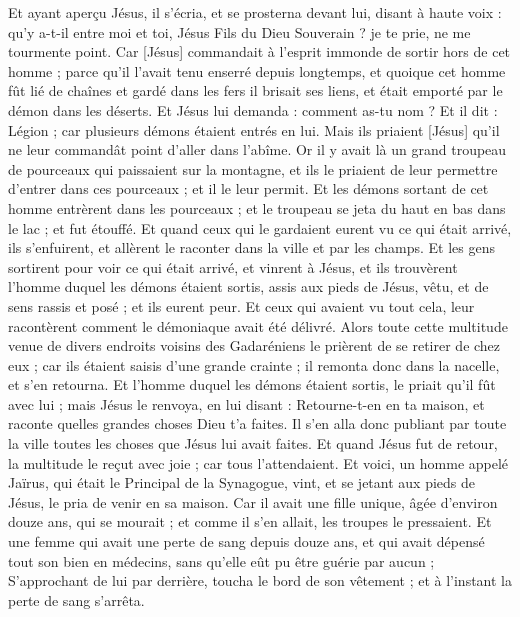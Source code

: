 \begin{multicols}{2}
Et ayant aperçu Jésus, il s'écria, et se prosterna devant lui, disant à haute voix : qu'y a-t-il entre moi et toi, Jésus Fils du Dieu Souverain ? je te prie, ne me tourmente point.
Car [Jésus] commandait à l'esprit immonde de sortir hors de cet homme ; parce qu'il l'avait tenu enserré depuis longtemps, et quoique cet homme fût lié de chaînes et gardé dans les fers il brisait ses liens, et était emporté par le démon dans les déserts.
Et Jésus lui demanda : comment as-tu nom ? Et il dit : Légion ; car plusieurs démons étaient entrés en lui.
Mais ils priaient [Jésus] qu'il ne leur commandât point d'aller dans l'abîme.
Or il y avait là un grand troupeau de pourceaux qui paissaient sur la montagne, et ils le priaient de leur permettre d'entrer dans ces pourceaux ; et il le leur permit.
Et les démons sortant de cet homme entrèrent dans les pourceaux ; et le troupeau se jeta du haut en bas dans le lac ; et fut étouffé.
Et quand ceux qui le gardaient eurent vu ce qui était arrivé, ils s'enfuirent, et allèrent le raconter dans la ville et par les champs.
Et les gens sortirent pour voir ce qui était arrivé, et vinrent à Jésus, et ils trouvèrent l'homme duquel les démons étaient sortis, assis aux pieds de Jésus, vêtu, et de sens rassis et posé ; et ils eurent peur.
Et ceux qui avaient vu tout cela, leur racontèrent comment le démoniaque avait été délivré.
Alors toute cette multitude venue de divers endroits voisins des Gadaréniens le prièrent de se retirer de chez eux ; car ils étaient saisis d'une grande crainte ; il remonta donc dans la nacelle, et s'en retourna.
Et l'homme duquel les démons étaient sortis, le priait qu'il fût avec lui ; mais Jésus le renvoya, en lui disant :
Retourne-t-en en ta maison, et raconte quelles grandes choses Dieu t'a faites. Il s'en alla donc publiant par toute la ville toutes les choses que Jésus lui avait faites.
Et quand Jésus fut de retour, la multitude le reçut avec joie ; car tous l'attendaient.
Et voici, un homme appelé Jaïrus, qui était le Principal de la Synagogue, vint, et se jetant aux pieds de Jésus, le pria de venir en sa maison.
Car il avait une fille unique, âgée d'environ douze ans, qui se mourait ; et comme il s'en allait, les troupes le pressaient.
Et une femme qui avait une perte de sang depuis douze ans, et qui avait dépensé tout son bien en médecins, sans qu'elle eût pu être guérie par aucun ;
S'approchant de lui par derrière, toucha le bord de son vêtement ; et à l'instant la perte de sang s'arrêta.

\end{multicols}
